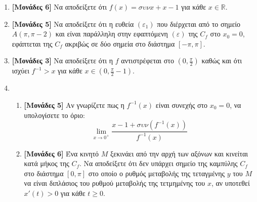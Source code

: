 \documentclass[14pt]{extarticle}
\begin{document}
  \begin{enumerate}
    \item \textbf{[Μονάδες 6]}  Να αποδείξετε ότι $f(x)=συνx+x-1$ για κάθε $x\in\mathbb{R}$.
    \item \textbf{[Μονάδες 5]}  Να αποδείξετε ότι η ευθεία $(ε_1)$ που διέρχεται από το σημείο $Α(π,π-2)$ και είναι παράλληλη στην εφαπτόμενη $(ε)$ της $C_f$ στο $x_0=0$, εφάπτεται της $C_f$ ακριβώς σε δύο σημεία στο διάστημα $[-π,π]$.
    \item \textbf{[Μονάδες 3]}  Να αποδείξετε ότι η $f$ αντιστρέφεται στο $(0,\frac{π}{2})$ καθώς και ότι ισχύει $f^{-1}>x$ για κάθε $x\in(0,\frac{π}{2}-1)$.
    \item
      \begin{enumerate}
        \item \textbf{[Μονάδες 5]}  Αν γνωρίζετε πως η $f^{-1}(x)$ είναι συνεχής στο $x_0=0$, να υπολογίσετε το όριο:
        $$\lim_{x\to 0^{+}}\frac{x-1+συν(f^{-1}(x))}{f^{-1}(x)}$$
        \item \textbf{[Μονάδες 6]}  Ένα κινητό $Μ$ ξεκινάει από την αρχή των αξόνων και κινείται κατά μήκος της $C_f$. Να αποδείξετε ότι δεν υπάρχει σημείο της καμπύλης $C_f$ στο διάστημα $[0,π]$ στο οποίο ο ρυθμός μεταβολής της τεταγμένης $y$ του $Μ$ να είναι διπλάσιος του ρυθμού μεταβολής της τετμημένης του $x$, αν υποτεθεί $x'(t)>0$ για κάθε $t\ge 0$.
      \end{enumerate}
  \end{enumerate}

\part*{}
\end{document}
